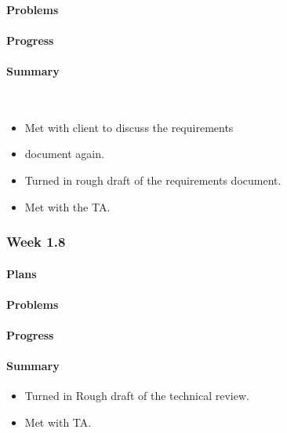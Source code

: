\documentclass[onecolumn, draftclsnofoot,10pt, compsoc]{article}
\begin{document}
		    \paragraph{Problems} \hfill \break

		    \paragraph{Progress} \hfill \break

		    \paragraph{Summary} \hfill \
		        \begin{itemize}
		            \item Met with client to discuss the requirements \item document again.
                    \item Turned in rough draft of the requirements document.
                    \item Met with the TA. \\
                \end{itemize}


		\subsubsection{Week 1.8}

			\paragraph{Plans} \hfill \break

		    \paragraph{Problems} \hfill \break

		    \paragraph{Progress} \hfill \break

		    \paragraph{Summary}
		    \begin{itemize}
		    \item Turned in Rough draft of the technical review.
            \item Met with TA.
            \end{itemize}
\end{document}
